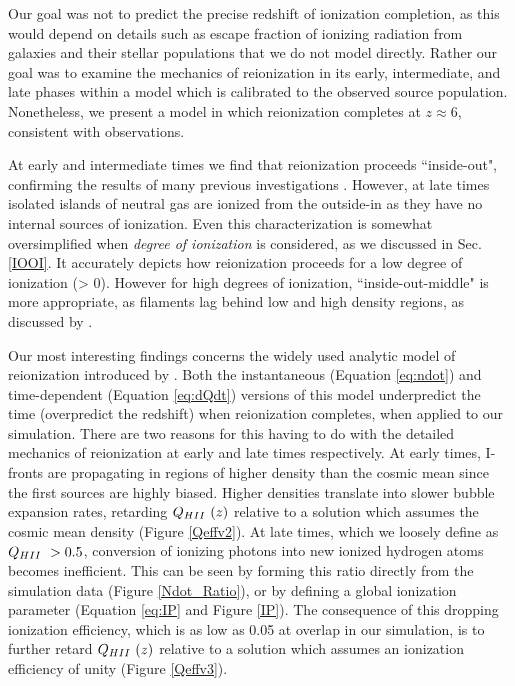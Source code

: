 Our goal was not to predict the precise redshift of ionization completion, as this would depend on details such as escape fraction of ionizing radiation from galaxies and their stellar populations that we do not model directly. Rather our goal was to examine the mechanics of reionization in its early, intermediate, and late phases within a model which is calibrated to the observed source population. Nonetheless, we present a model in which reionization completes at $z\approx 6$, consistent with observations. 

At early and intermediate times we find that reionization proceeds ``inside-out", confirming the results of many previous investigations \citep{Gnedin2000,RazoumovEtAl2002,SokasianEtAl2003,FurlanettoEtAl2004,IlievEtAl2006,TracCen2007,TracEtAl2008}. However, at late times isolated islands of neutral gas are ionized from the outside-in as they have no internal sources of ionization. Even this characterization is somewhat oversimplified when {\em degree of ionization} is considered, as we discussed in Sec. \ref{IOOI}. It accurately depicts how reionization proceeds for a low degree of ionization (> 0). However for high degrees of ionization, ``inside-out-middle" is more appropriate, as filaments lag behind low and high density regions, as discussed by \cite{FinlatorEtAl2009}. 

Our most interesting findings concerns the widely used analytic model of reionization introduced by \cite{MadauEtAl1999}. Both the instantaneous (Equation \ref{eq:ndot}) and time-dependent (Equation \ref{eq:dQdt}) versions of this model underpredict the time (overpredict the redshift) when reionization completes, when applied to our simulation. There are two reasons for this having to do with the detailed mechanics of reionization at early and late times respectively. At early times, I-fronts are propagating in regions of higher density than the cosmic mean since the first sources are highly biased. Higher densities translate into slower bubble expansion rates, retarding $Q_{\hii}(z)$ relative to a solution which assumes the cosmic mean density (Figure \ref{Qeffv2}). At late times, which we loosely define as $Q_{\hii} > 0.5$, conversion of ionizing photons into new ionized hydrogen atoms becomes inefficient. This can be seen by forming this ratio directly from the simulation data (Figure \ref{Ndot_Ratio}), or by defining a global \hi  ionization parameter (Equation \eqref{eq:IP} and Figure \ref{IP}). The consequence of this dropping ionization efficiency, which is as low as 0.05 at overlap in our simulation, is to further retard $Q_{\hii}(z)$ relative to a solution which assumes an ionization efficiency of unity (Figure \ref{Qeffv3}).

